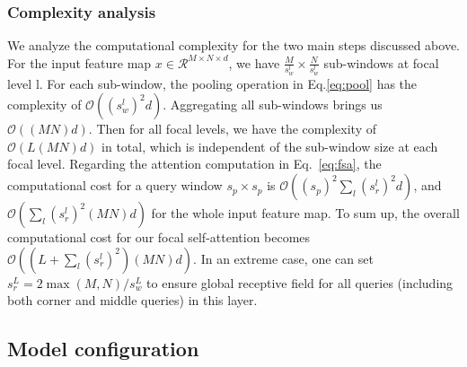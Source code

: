 \documentclass{article}
\begin{document}
\subsubsection{Complexity analysis}

We analyze the computational complexity for the two main steps discussed above. For the input feature map $x \in \mathcal{R}^{M \times N \times d}$, we have $\frac{M}{s_w^l} \times \frac{N}{s_w^l}$ sub-windows at focal level l. For each sub-window, the pooling operation in Eq.\ref{eq:pool} has the complexity of $\mathcal{O}((s_w^l)^2d)$. Aggregating all sub-windows brings us $\mathcal{O}((MN)d)$. Then for all focal levels, we have the complexity of $\mathcal{O}(L(MN)d)$ in total, which is independent of the sub-window size at each focal level. Regarding the attention computation in Eq.~\ref{eq:fsa}, the computational cost for a query window $s_p\times s_p$ is $\mathcal{O}((s_p)^2 \sum_l (s_r^l)^2d)$, and $\mathcal{O}(\sum_l (s_r^l)^2(MN)d)$ for the whole input feature map. To sum up, the overall computational cost for our focal self-attention becomes $\mathcal{O}((L+\sum_l (s_r^l)^2)(MN)d)$. In an extreme case, one can set $s_r^L=2\max(M,N)/s_w^L$ to ensure global receptive field for all queries (including both corner and middle queries) in this layer. 












\subsection{Model configuration}
\end{document}
